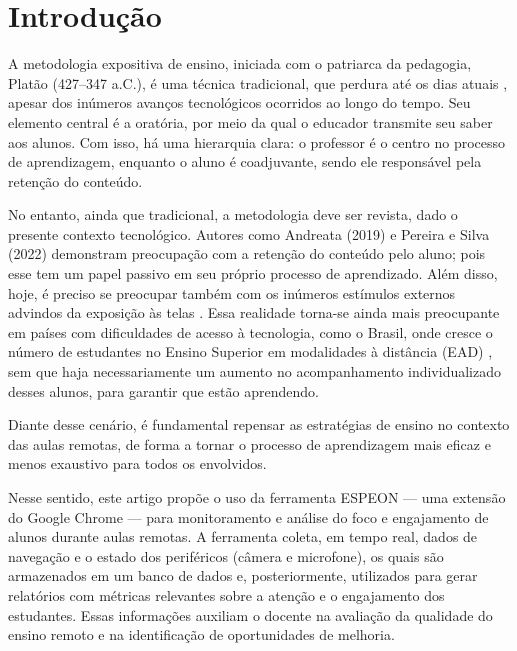 \section{Introdução}\label{sec:introdução}

A metodologia expositiva de ensino, iniciada com o patriarca da pedagogia, Platão (427–347 a.C.), é uma técnica tradicional, que perdura até os dias atuais \cite{ANDREATA2019}, apesar dos inúmeros avanços tecnológicos ocorridos ao longo do tempo. Seu elemento central é a oratória, por meio da qual o educador transmite seu saber aos alunos. Com isso, há uma hierarquia clara: o professor é o centro no processo de aprendizagem, enquanto o aluno é coadjuvante, sendo ele responsável pela retenção do conteúdo.

No entanto, ainda que tradicional, a metodologia deve ser revista, dado o presente contexto tecnológico. Autores como Andreata (2019) \cite{ANDREATA2019} e Pereira e Silva (2022) \cite{pereira2022critica} demonstram preocupação com a retenção do conteúdo pelo aluno; pois esse tem um papel passivo em seu próprio processo de aprendizado. Além disso, hoje, é preciso se preocupar também com os inúmeros estímulos externos advindos da exposição às telas \cite{lopes2017uso}. Essa realidade torna-se ainda mais preocupante em países com dificuldades de acesso à tecnologia, como o Brasil, onde cresce o número de estudantes no Ensino Superior em modalidades à distância (EAD) \cite{moran2009ensino}, sem que haja necessariamente um aumento no acompanhamento individualizado desses alunos, para garantir que estão aprendendo. 

Diante desse cenário, é fundamental repensar as estratégias de ensino no contexto das aulas remotas, de forma a tornar o processo de aprendizagem mais eficaz e menos exaustivo para todos os envolvidos.

Nesse sentido, este artigo propõe o uso da ferramenta ESPEON — uma extensão do Google Chrome — para monitoramento e análise do foco e engajamento de alunos durante aulas remotas. A ferramenta coleta, em tempo real, dados de navegação e o estado dos periféricos (câmera e microfone), os quais são armazenados em um banco de dados e, posteriormente, utilizados para gerar relatórios com métricas relevantes sobre a atenção e o engajamento dos estudantes. Essas informações auxiliam o docente na avaliação da qualidade do ensino remoto e na identificação de oportunidades de melhoria.
